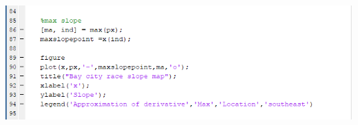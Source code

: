 \documentclass[a4paper]{article}
\begin{document}
	\includegraphics{quadtest3.PNG}

	
	
\end{document}
